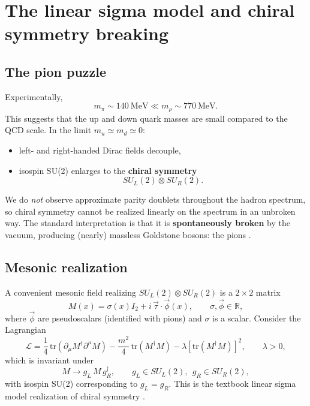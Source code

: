 \section{The linear sigma model and chiral symmetry breaking}

\subsection{The pion puzzle}

Experimentally,
\begin{equation}
m_\pi \sim 140~\text{MeV} \ll m_\rho \sim 770~\text{MeV}.
\end{equation}
This suggests that the up and down quark masses are small compared to the QCD scale.
In the limit $m_u\simeq m_d\simeq 0$:
\begin{itemize}
  \item left- and right-handed Dirac fields decouple,
  \item isospin SU(2) enlarges to the \textbf{chiral symmetry}
  \begin{equation}
  SU_L(2)\otimes SU_R(2).
  \end{equation}
\end{itemize}

We do \emph{not} observe approximate parity doublets throughout the hadron spectrum,
so chiral symmetry cannot be realized linearly on the spectrum in an unbroken way.
The standard interpretation is that it is \textbf{spontaneously broken} by the vacuum,
producing (nearly) massless Goldstone bosons: the pions
\citep{peskin1995,weinberg1995qtf1,schwartz2014,donoghue1992}.

\subsection{Mesonic realization}

A convenient mesonic field realizing $SU_L(2)\otimes SU_R(2)$ is a $2\times 2$ matrix
\begin{equation}
M(x)=\sigma(x)I_2+i\,\vec\tau\cdot\vec\phi(x),
\qquad \sigma,\vec\phi\in\mathbb{R},
\label{eq:M_field_def}
\end{equation}
where $\vec\phi$ are pseudoscalars (identified with pions) and $\sigma$ is a scalar.
Consider the Lagrangian
\begin{equation}
\mathcal{L}
=\frac14\,\mathrm{tr}\!\left(\partial_\mu M^\dagger \partial^\mu M\right)
-\frac{m^2}{4}\,\mathrm{tr}\!\left(M^\dagger M\right)
-\lambda\left[\mathrm{tr}\!\left(M^\dagger M\right)\right]^2,
\qquad \lambda>0,
\label{eq:lin_sigma_lagrangian}
\end{equation}
which is invariant under
\begin{equation}
M \to g_L\,M\,g_R^\dagger,
\qquad g_L\in SU_L(2),\ \ g_R\in SU_R(2),
\label{eq:chiral_transform_M}
\end{equation}
with isospin SU(2) corresponding to $g_L=g_R$.
This is the textbook linear sigma model realization of chiral symmetry
\citep{peskin1995,schwartz2014,weinberg1995qtf1}.

